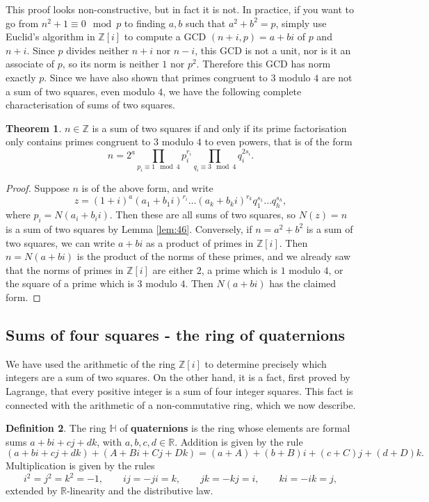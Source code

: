 \documentclass{article}
\newcommand{\Z}{\mathbb{Z}}
\newcommand{\R}{\mathbb{R}}
\renewcommand{\H}{\mathbb{H}}
\newcommand{\rb}[1]{\left( #1 \right)}
\renewcommand{\sb}[1]{\left[ #1 \right]}
\theoremstyle{definition}\newtheorem{definition}{Definition}
\theoremstyle{definition}\newtheorem{remark}[definition]{Remark}
\theoremstyle{definition}\newtheorem*{example}{Example}
\theoremstyle{definition}\newtheorem*{note}{Note}
\newtheorem{theorem}[definition]{Theorem}
\begin{document}
This proof looks non-constructive, but in fact it is not. In practice, if you want to go from $ n^2 + 1 \equiv 0 \mod p $ to finding $ a, b $ such that $ a^2 + b^2 = p $, simply use Euclid's algorithm in $ \Z\sb{i} $ to compute a GCD $ \rb{n + i, p} = a + bi $ of $ p $ and $ n + i $. Since $ p $ divides neither $ n + i $ nor $ n - i $, this GCD is not a unit, nor is it an associate of $ p $, so its norm is neither $ 1 $ nor $ p^2 $. Therefore this GCD has norm exactly $ p $. Since we have also shown that primes congruent to $ 3 $ modulo $ 4 $ are not a sum of two squares, even modulo $ 4 $, we have the following complete characterisation of sums of two squares.

\begin{theorem}
$ n \in \Z $ is a sum of two squares if and only if its prime factorisation only contains primes congruent to $ 3 $ modulo $ 4 $ to even powers, that is of the form
$$ n = 2^a\prod_{p_i \equiv 1 \mod 4} p_i^{r_i}\prod_{q_i \equiv 3 \mod 4} q_i^{2s_i}. $$
\end{theorem}

\begin{proof}
Suppose $ n $ is of the above form, and write
$$ z = \rb{1 + i}^a\rb{a_1 + b_1i}^{r_i} \dots \rb{a_k + b_ki}^{r_k}q_1^{s_1} \dots q_h^{s_h}, $$
where $ p_i = N\rb{a_i + b_ii} $. Then these are all sums of two squares, so $ N\rb{z} = n $ is a sum of two squares by Lemma \ref{lem:46}. Conversely, if $ n = a^2 + b^2 $ is a sum of two squares, we can write $ a + bi $ as a product of primes in $ \Z\sb{i} $. Then $ n = N\rb{a + bi} $ is the product of the norms of these primes, and we already saw that the norms of primes in $ \Z\sb{i} $ are either $ 2 $, a prime which is $ 1 $ modulo $ 4 $, or the square of a prime which is $ 3 $ modulo $ 4 $. Then $ N\rb{a + bi} $ has the claimed form.
\end{proof}

\subsection{Sums of four squares - the ring of quaternions}

We have used the arithmetic of the ring $ \Z\sb{i} $ to determine precisely which integers are a sum of two squares. On the other hand, it is a fact, first proved by Lagrange, that every positive integer is a sum of four integer squares. This fact is connected with the arithmetic of a non-commutative ring, which we now describe.

\begin{definition}
The ring $ \H $ of \textbf{quaternions} is the ring whose elements are formal sums $ a + bi + cj + dk $, with $ a, b, c, d \in \R $. Addition is given by the rule
$$ \rb{a + bi + cj + dk} + \rb{A + Bi + Cj + Dk} = \rb{a + A} + \rb{b + B}i + \rb{c + C}j + \rb{d + D}k. $$
Multiplication is given by the rules
$$ i^2 = j^2 = k^2 = -1, \qquad ij = -ji = k, \qquad jk = -kj = i, \qquad ki = -ik = j, $$
extended by $ \R $-linearity and the distributive law.
\end{definition}
\end{document}
